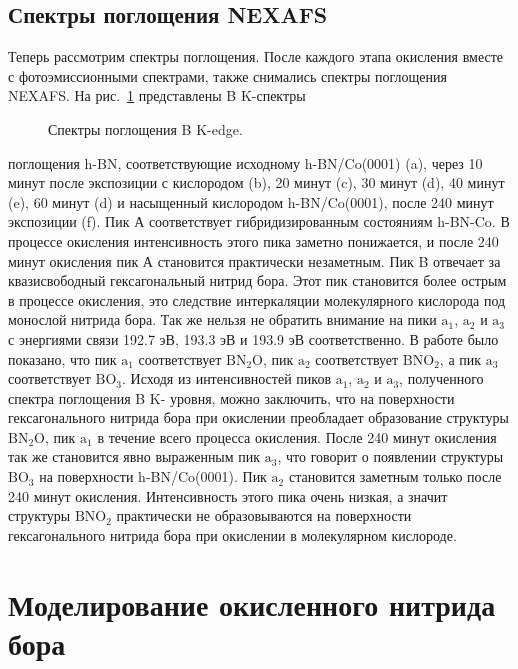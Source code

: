 \subsection{Спектры поглощения NEXAFS}

Теперь рассмотрим спектры поглощения. После каждого этапа окисления вместе с фотоэмиссионными спектрами,
также снимались спектры поглощения NEXAFS. На рис.~\ref{pic:NEXAFS_B_K_edge} представлены B K-спектры
\begin{figure}[!ht]
\caption{Спектры поглощения B K-edge.}
\label{pic:NEXAFS_B_K_edge}
\end{figure}
поглощения h-BN, соответствующие исходному h-BN/Co(0001) (a), через 10 минут после экспозиции с кислородом (b), 
20 минут (c), 30 минут (d), 40 минут (e), 60 минут (d) и насыщенный кислородом h-BN/Co(0001), после 240 минут
экспозиции (f). Пик А соответствует гибридизированным состояниям h-BN-Co. В процессе окисления интенсивность
этого пика заметно понижается, и после 240 минут окисления пик А становится практически незаметным.
Пик B отвечает за квазисвободный гексагональный нитрид бора. Этот пик становится более острым в процессе 
окисления, это следствие интеркаляции молекулярного кислорода под монослой нитрида бора. Так же нельзя не 
обратить внимание на пики $\mathrm{a_1}$, $\mathrm{a_2}$ и $\mathrm{a_3}$ с энергиями связи 192.7 эВ, 193.3 эВ 
и 193.9 эВ соответственно. В работе \cite{Huber2015_Oxy_Stab_defffects_in_hBN} было показано, что пик $\mathrm{a_1}$
соответствует $\mathrm{BN_2O}$, пик $\mathrm{a_2}$ соответствует $\mathrm{BNO_2}$, а пик $\mathrm{a_3}$ соответствует
$\mathrm{BO_3}$. Исходя из интенсивностей пиков $\mathrm{a_1}$, $\mathrm{a_2}$ и $\mathrm{a_3}$, полученного спектра
поглощения B K- уровня, можно заключить, что на поверхности гексагонального нитрида бора при окислении преобладает
образование структуры $\mathrm{BN_2O}$, пик $\mathrm{a_1}$ в течение всего процесса окисления. После 240 минут окисления
так же становится явно выраженным пик $\mathrm{a_3}$, что говорит о появлении структуры $\mathrm{BO_3}$ на поверхности 
h-BN/Co(0001). Пик $\mathrm{a_2}$ становится заметным только после 240 минут окисления. Интенсивность этого пика очень
низкая, а значит структуры $\mathrm{BNO_2}$ практически не образовываются на поверхности гексагонального нитрида бора
при окислении в молекулярном кислороде.

\section{Моделирование окисленного нитрида бора}
